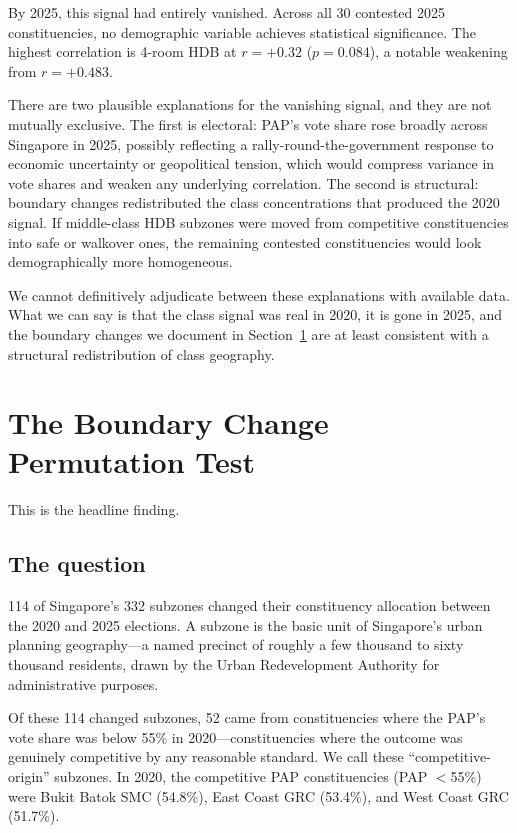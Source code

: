 \documentclass[12pt]{article}
\begin{document}
By 2025, this signal had entirely vanished. Across all 30 contested 2025 constituencies, no
demographic variable achieves statistical significance. The highest correlation is 4-room HDB at
$r = +0.32$ ($p = 0.084$), a notable weakening from $r = +0.483$.

There are two plausible explanations for the vanishing signal, and they are not mutually
exclusive. The first is electoral: PAP's vote share rose broadly across Singapore in 2025,
possibly reflecting a rally-round-the-government response to economic uncertainty or geopolitical
tension, which would compress variance in vote shares and weaken any underlying correlation. The
second is structural: boundary changes redistributed the class concentrations that produced the
2020 signal. If middle-class HDB subzones were moved from competitive constituencies into safe or
walkover ones, the remaining contested constituencies would look demographically more homogeneous.

We cannot definitively adjudicate between these explanations with available data. What we can say
is that the class signal was real in 2020, it is gone in 2025, and the boundary changes we
document in Section~\ref{sec:permutation} are at least consistent with a structural redistribution
of class geography.

\section{The Boundary Change Permutation Test}
\label{sec:permutation}

This is the headline finding.

\subsection{The question}

114 of Singapore's 332 subzones changed their constituency allocation between the 2020 and 2025
elections. A subzone is the basic unit of Singapore's urban planning geography---a named precinct
of roughly a few thousand to sixty thousand residents, drawn by the Urban Redevelopment Authority
for administrative purposes.

Of these 114 changed subzones, 52 came from constituencies where the PAP's vote share was below
55\% in 2020---constituencies where the outcome was genuinely competitive by any reasonable
standard. We call these ``competitive-origin'' subzones. In 2020, the competitive PAP
constituencies (PAP $<$55\%) were Bukit Batok SMC (54.8\%), East Coast GRC (53.4\%), and West
Coast GRC (51.7\%).
\end{document}
